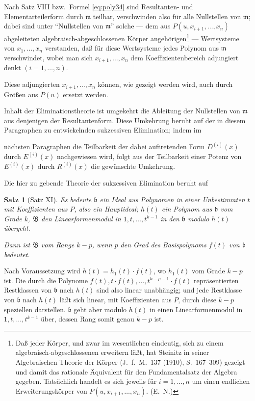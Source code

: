 \documentclass[fontsize=10pt,paper=a5,pagesize,headings=small]{scrbook}
\newcommand{\ideal}[1]{\mathfrak{#1}}
\theoremstyle{plain}
\newtheorem*{satz}{Satz}
\begin{document}
Nach Satz VIII bzw.~Formel \eqref{eq:poly34} sind Resultanten- und Elementarteilerform
durch $\ideal{m}$ teilbar, verschwinden also für alle Nullstellen von $\ideal{m}$; dabei sind unter
``Nullstellen von $\ideal{m}$'' solche --- dem aus $P(u, x_{i+1},\dots,x_n)$ abgeleiteten
algebraisch-abgeschlossenen Körper angehörigen\footnote{Daß jeder Körper, und zwar im
wesentlichen eindeutig, sich zu einem algebraisch-abgeschlossenen erweitern läßt, hat
Steinitz in seiner Algebraischen Theorie der Körper (J.~f.~M.\ 137 (1910), S.~167--309)
gezeigt und damit das rationale Äquivalent für den Fundamentalsatz der Algebra gegeben.
Tatsächlich handelt es sich jeweils für $i=1,\dots,n$ um einen endlichen Erweiterungskörper
von $P(u, x_{i+1},\dots,x_n)$. (E.~N.)} --- Wertsysteme von $x_1,\dots,x_n$ verstanden, daß für
diese Wertsysteme jedes Polynom aus $\ideal{m}$ verschwindet, wobei man sich $x_{i+1},\dots,x_n$
dem Koeffizientenbereich adjungiert denkt $(i=1,\dots,n)$.

Diese adjungierten $x_{i+1},\dots,x_n$ können, wie gezeigt werden wird, auch durch Größen
aus $P(u)$ ersetzt werden.

Inhalt der Eliminationstheorie ist umgekehrt die Ableitung der Nullstellen von
$\ideal{m}$ aus denjenigen der Resultantenform. Diese Umkehrung beruht auf der in diesem
Paragraphen zu entwickelnden sukzessiven Elimination; indem im

\newpage
\setcounter{page}{445}

nächsten Paragraphen die Teilbarkeit der dabei auftretenden Form $D^{(i)}(x)$ durch
$E^{(i)}(x)$ nachgewiesen wird, folgt aus der Teilbarkeit einer Potenz von $E^{(i)}(x)$ durch
$R^{(i)}(x)$ die gewünschte Umkehrung.

Die hier zu gebende Theorie der sukzessiven Elimination beruht auf

\begin{satz}[Satz XI]
Es bedeute $\ideal{b}$ ein Ideal aus Polynomen in einer Unbestimmten $t$ mit Koeffizienten
aus $P$, also ein Hauptideal; $h(t)$ ein Polynom aus $\ideal{b}$ vom Grade $k$, $\mathfrak{B}$ den
Linearformenmodul in $1,t,\dots,t^{k-1}$ in den $\ideal{b}$ modulo $h(t)$ übergeht.

Dann ist $\mathfrak{B}$ vom Range $k-p$, wenn $p$ den Grad des Basispolynoms $f(t)$ von $\ideal{b}$
bedeutet.
\end{satz}

Nach Voraussetzung wird $h(t) = h_1(t) \cdot f(t)$, wo $h_1(t)$ vom Grade $k-p$ ist. Die
durch die Polynome $f(t), t\cdot f(t),\dots,t^{k-p-1}\cdot f(t)$ repräsentierten Restklassen von
$\ideal{b}$ nach $h(t)$ sind also linear unabhängig; und jede Restklasse von $\ideal{b}$ nach $h(t)$ läßt
sich linear, mit Koeffizienten aus $P$, durch diese $k-p$ speziellen darstellen.
$\ideal{b}$ geht aber modulo $h(t)$ in einen Linearformenmodul in $1,t,\dots,t^{k-1}$ über, dessen
Rang somit genau $k-p$ ist.
\end{document}
